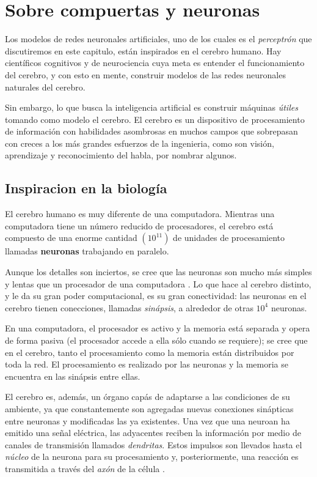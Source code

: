 \section{Sobre compuertas y neuronas}
Los modelos de redes neuronales artificiales, uno de los cuales es el \textit{perceptrón}
que discutiremos en este capitulo, están inspirados en el cerebro humano. Hay científicos
cognitivos y de neurociencia cuya meta es entender el funcionamiento del cerebro, y con
esto en mente, construir modelos de las redes neuronales naturales del cerebro.

Sin embargo, lo que busca la inteligencia artificial es construir máquinas \textit{útiles}
tomando como modelo el cerebro. El cerebro es un dispositivo de procesamiento de información
con habilidades asombrosas en muchos campos que sobrepasan con creces a los más grandes
esfuerzos de la ingenieria, como son visión, aprendizaje y reconocimiento del habla, por
nombrar algunos.
\subsection{Inspiracion en la biología}
El cerebro humano es muy diferente de una computadora. Mientras una computadora tiene
un número reducido de procesadores, el cerebro está compuesto de una enorme cantidad $(10^{11})$
de unidades de procesamiento llamadas \textbf{neuronas} trabajando en paralelo.

Aunque los detalles son inciertos, se cree que las neuronas son mucho más simples y lentas
que un procesador de una computadora \cite{ethem}. Lo que hace al cerebro distinto, y le da
su gran poder computacional, es su gran conectividad: las neuronas en el cerebro tienen
conecciones, llamadas \textit{sinápsis}, a alrededor de otras $10^{4}$ neuronas.

En una computadora, el procesador es activo y la memoria está separada y opera de forma pasiva
(el procesador accede a ella sólo cuando se requiere); se cree que en el cerebro, tanto el
procesamiento como la memoria están distribuidos por toda la red. El procesamiento es realizado
por las neuronas y la memoria se encuentra en las sinápsis entre ellas.

El cerebro es, además, un órgano capás de adaptarse a las condiciones de su ambiente, ya que
constantemente son agregadas nuevas conexiones sinápticas entre neuronas y modificadas
las ya existentes. Una vez que una neuroan ha emitido una señal eléctrica, las adyacentes
reciben la información por medio de canales de transmisión llamados \textit{dendritas}. Estos
impulsos son llevados hasta el \textit{núcleo} de la neurona para su procesamiento y, posteriormente,
una reacción es transmitida a través del \textit{axón} de la célula \cite{memes}.


